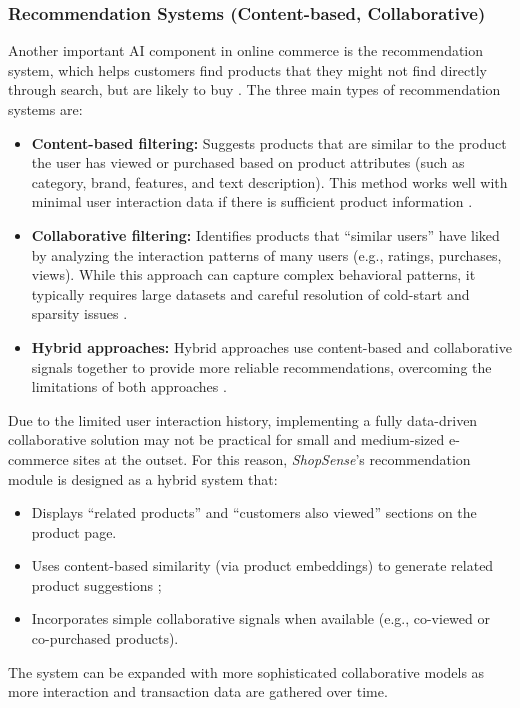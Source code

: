 \subsubsection{Recommendation Systems (Content-based, Collaborative)}
Another important AI component in online commerce is the recommendation system, which helps customers find products that they might not find directly through search, but are likely to buy \cite{ricci2015recommender}. The three main types of recommendation systems are:
\begin{itemize}
  \item \textbf{Content-based filtering:} Suggests products that are similar to the product the user has viewed or purchased based on product attributes (such as category, brand, features, and text description). This method works well with minimal user interaction data if there is sufficient product information \cite{ricci2015recommender}.
  \item \textbf{Collaborative filtering:} Identifies products that “similar users” have liked by analyzing the interaction patterns of many users (e.g., ratings, purchases, views). While this approach can capture complex behavioral patterns, it typically requires large datasets and careful resolution of cold-start and sparsity issues \cite{koren2009matrix}.
  \item \textbf{Hybrid approaches:} Hybrid approaches use content-based and collaborative signals together to provide more reliable recommendations, overcoming the limitations of both approaches \cite{ricci2015recommender}.
\end{itemize}

Due to the limited user interaction history, implementing a fully data-driven collaborative solution may not be practical for small and medium-sized e-commerce sites at the outset. 
For this reason, \textit{ShopSense}’s recommendation module is designed as a hybrid system that:

\begin{itemize}
  \item Displays “related products” and “customers also viewed” sections on the product page.
  \item Uses content-based similarity (via product embeddings) to generate related product suggestions \cite{koren2009matrix};
  \item Incorporates simple collaborative signals when available (e.g., co-viewed or co-purchased products). 
\end{itemize} 
The system can be expanded with more sophisticated collaborative models as more interaction and transaction data are gathered over time.

